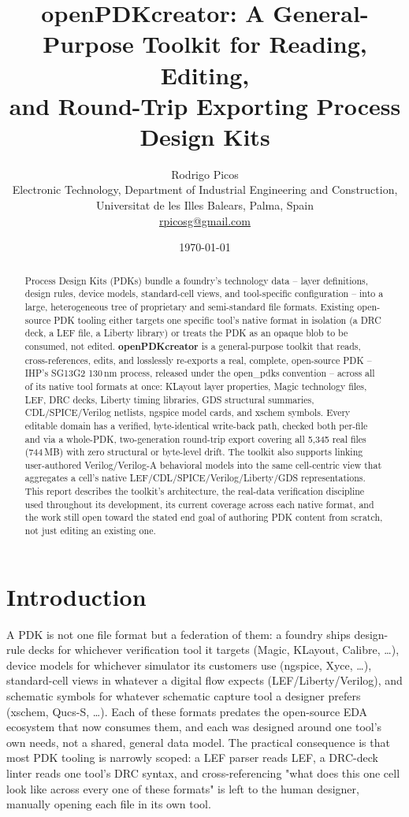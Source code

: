 \documentclass[a4paper,11pt]{article}
\title{openPDKcreator: A General-Purpose Toolkit for Reading, Editing,\\
and Round-Trip Exporting Process Design Kits}
\author{Rodrigo Picos\\
\small Electronic Technology, Department of Industrial Engineering and Construction,\\
\small Universitat de les Illes Balears, Palma, Spain\\
\small \href{mailto:rpicosg@gmail.com}{rpicosg@gmail.com}}
\date{\today}
\begin{document}
\maketitle

\begin{abstract}
Process Design Kits (PDKs) bundle a foundry's technology data --
layer definitions, design rules, device models, standard-cell views,
and tool-specific configuration -- into a large, heterogeneous tree of
proprietary and semi-standard file formats. Existing open-source PDK
tooling either targets one specific tool's native format in isolation
(a DRC deck, a LEF file, a Liberty library) or treats the PDK as an
opaque blob to be consumed, not edited. \textbf{openPDKcreator} is a
general-purpose toolkit that reads, cross-references, edits, and
losslessly re-exports a real, complete, open-source PDK --
IHP's SG13G2 130\,nm process, released under the open\_pdks
convention -- across all of its native tool formats at once: KLayout
layer properties, Magic technology files, LEF, DRC decks, Liberty
timing libraries, GDS structural summaries, CDL/SPICE/Verilog
netlists, ngspice model cards, and xschem symbols. Every editable
domain has a verified, byte-identical write-back path, checked both
per-file and via a whole-PDK, two-generation round-trip export
covering all 5{,}345 real files (744\,MB) with zero structural or
byte-level drift. The toolkit also supports linking user-authored
Verilog/Verilog-A behavioral models into the same cell-centric view
that aggregates a cell's native LEF/CDL/SPICE/Verilog/Liberty/GDS
representations. This report describes the toolkit's architecture,
the real-data verification discipline used throughout its
development, its current coverage across each native format, and the
work still open toward the stated end goal of authoring PDK content
from scratch, not just editing an existing one.
\end{abstract}

\tableofcontents

\section{Introduction}

A PDK is not one file format but a federation of them: a foundry
ships design-rule decks for whichever verification tool it targets
(Magic, KLayout, Calibre, \ldots), device models for whichever
simulator its customers use (ngspice, Xyce, \ldots), standard-cell
views in whatever a digital flow expects (LEF/Liberty/Verilog), and
schematic symbols for whatever schematic capture tool a designer
prefers (xschem, Qucs-S, \ldots). Each of these formats predates the
open-source EDA ecosystem that now consumes them, and each was
designed around one tool's own needs, not a shared, general data
model. The practical consequence is that most PDK tooling is
narrowly scoped: a LEF parser reads LEF, a DRC-deck linter reads one
tool's DRC syntax, and cross-referencing "what does this one cell
look like across every one of these formats" is left to the human
designer, manually opening each file in its own tool.
\end{document}
